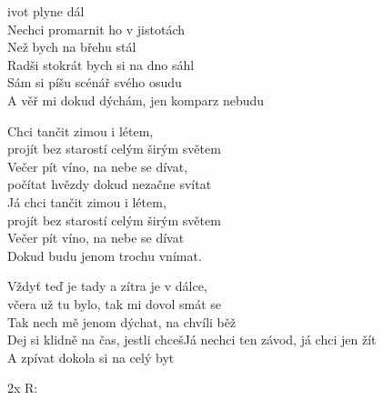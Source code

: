 
\ve
{}ivot plyne dál\\
Nechci promarnit ho v jistotách\\
Než bych na břehu stál\\
Radši stokrát bych si na dno sáhl \\
Sám si píšu scénář svého osudu\\
A věř mi dokud dýchám, jen komparz nebudu

\cho{}
Chci tančit zimou i létem,\\
projít bez starostí celým širým světem\\
Večer pít víno, na nebe se dívat,\\
počítat hvězdy dokud nezačne svítat\\
Já chci tančit zimou i létem,\\
projít bez starostí celým širým světem\\
Večer pít víno, na nebe se dívat\\
Dokud budu jenom trochu vnímat.

\ve
Vždyť teď je tady a zítra je v dálce,\\
včera už tu bylo, tak mi dovol smát se\\
Tak nech mě jenom dýchat, na chvíli běž\\
Dej si klidně na čas, jestli chcešJá nechci ten závod, já chci jen žít\\
A zpívat dokola si na celý byt

\re{}2x R:
\esong{}